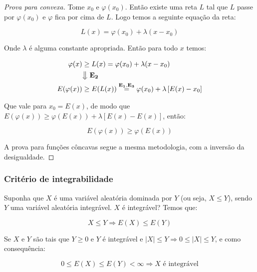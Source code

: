 \documentclass[
]{article}
\theoremstyle{definition}
\theoremstyle{definition}
\theoremstyle{definition}
\theoremstyle{definition}
\theoremstyle{remark}
\begin{document}
\begin{proof}[Prova para convexa]
Tome \(x_{0}\) e \(\varphi(x_{0})\). Então existe uma reta \(L\) tal que \(L\) passe por \(\varphi(x_{0})\) e \(\varphi\) fica por cima de \(L\). Logo temos a seguinte equação da reta:

\begin{equation*}
L(x) = \varphi(x_{0}) + \lambda(x - x_{0})
\end{equation*}

Onde \(\lambda\) é alguma constante apropriada. Então para todo \(x\) temos:

\begin{align*}
\varphi(x) &\ge L(x) = \varphi(x_{0}) + \lambda(x - x_{0}) \\
&\big{\Downarrow} \;\mathbf{E_{2}} \\
E(\varphi(x)) &\ge E(L(x)) \stackrel{\mathbf{E_{1},E_{3}}}{=} \varphi(x_{0}) + \lambda\left[E(x) - x_{0}\right]
\end{align*}

Que vale para \(x_{0} = E(x)\), de modo que \(E(\varphi(x)) \ge \varphi(E(x)) + \lambda\left[E(x) - E(x)\right]\), então:

\begin{equation*}
E(\varphi(x)) \ge \varphi(E(x))
\end{equation*}

A prova para funções côncavas segue a mesma metodologia, com a inversão da desigualdade.
\end{proof}

\hypertarget{crituxe9rio-de-integrabilidade}{%
\subsubsection{Critério de integrabilidade}\label{crituxe9rio-de-integrabilidade}}

Suponha que \(X\) é uma variável aleatória dominada por \(Y\) (ou seja, \(X \le Y\)), sendo \(Y\) uma variável aleatória integrável. \(X\) é integrável? Temos que:

\begin{equation*}
X \le Y \Rightarrow E(X) \le E(Y)
\end{equation*}

Se \(X\) e \(Y\) são tais que \(Y \ge 0\) e \(Y\) é integrável e \(|X| \le Y \Rightarrow 0 \le |X| \le Y\), e como consequência:

\begin{equation*}
0 \le E(X) \le E(Y) < \infty \Longrightarrow X \text{ é integrável}
\end{equation*}
\end{document}
